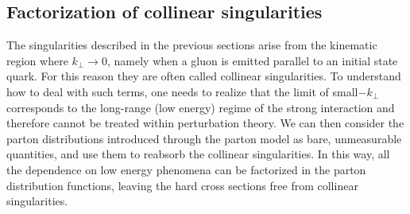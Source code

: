 \subsection{Factorization of collinear singularities}
The singularities described in the previous sections arise from the kinematic region where $k_{\perp}\rightarrow 0$,
namely when a gluon is emitted parallel to an initial state quark. For this reason they are often called collinear
singularities.
To understand how to deal with such terms, one needs to realize that the limit of small$-k_{\perp}$
corresponds to the long-range (low energy) regime of the strong interaction and therefore cannot be treated
within perturbation theory.
We can then consider the parton distributions introduced through the parton model as bare, unmeasurable
quantities, and use them to reabsorb the collinear singularities. In this way, all the dependence on
low energy phenomena can be factorized in the parton distribution functions, leaving the hard
cross sections free from collinear singularities.

